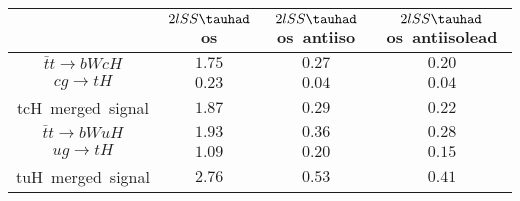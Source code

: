 \centering
\begin{tabular}{|c|c|c|c|} \hline
 & $2lSS\tauhad$ os & $2lSS\tauhad$ os~antiiso & $2lSS\tauhad$ os~antiisolead\\\hline
$\bar{t}t\to bWcH$ & $1.75$ & $0.27$ & $0.20$\\\hline
$cg\to tH$ & $0.23$ & $0.04$ & $0.04$\\\hline
tcH~merged~signal & $1.87$ & $0.29$ & $0.22$\\\hline
$\bar{t}t\to bWuH$ & $1.93$ & $0.36$ & $0.28$\\\hline
$ug\to tH$ & $1.09$ & $0.20$ & $0.15$\\\hline
tuH~merged~signal & $2.76$ & $0.53$ & $0.41$\\\hline
\end{tabular}
